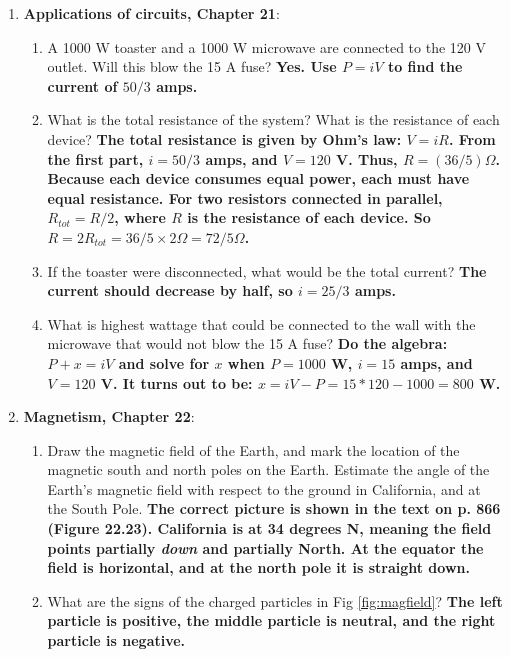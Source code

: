 \documentclass[10pt]{article}
\begin{document}
\maketitle

\begin{enumerate}
\item \textbf{Applications of circuits, Chapter 21}:
\begin{enumerate}
\item A 1000 W toaster and a 1000 W microwave are connected to the 120 V outlet.  Will this blow the 15 A fuse? \textbf{Yes.  Use $P = iV$ to find the current of $50/3$ amps.}
\item What is the total resistance of the system?  What is the resistance of each device? \textbf{The total resistance is given by Ohm's law: $V = i R$.  From the first part, $i = 50/3$ amps, and $V = 120$ V.  Thus, $R = (36/5) \Omega$.  Because each device consumes equal power, each must have equal resistance.  For two resistors connected in parallel, $R_{tot} = R/2$, where $R$ is the resistance of each device.  So $R = 2 R_{tot} = 36/5 \times 2 \Omega = 72/5 \Omega $.}
\item If the toaster were disconnected, what would be the total current? \textbf{The current should decrease by half, so $i = 25/3$ amps.}
\item What is highest wattage that could be connected to the wall with the microwave that would not blow the 15 A fuse? \textbf{Do the algebra: $P + x = iV$ and solve for $x$ when $P = 1000$ W, $i = 15$ amps, and $V = 120$ V.  It turns out to be: $x = iV - P = 15*120 - 1000 = 800$ W.}
\end{enumerate}
\item \textbf{Magnetism, Chapter 22}:
\begin{enumerate}
\item Draw the magnetic field of the Earth, and mark the location of the magnetic south and north poles on the Earth.  Estimate the angle of the Earth's magnetic field with respect to the ground in California, and at the South Pole. \textbf{The correct picture is shown in the text on p. 866 (Figure 22.23).  California is at 34 degrees N, meaning the field points partially \textit{down} and partially \textbf{North}.  At the equator the field is horizontal, and at the north pole it is straight down.}
\item What are the signs of the charged particles in Fig \ref{fig:magfield}? \textbf{The left particle is positive, the middle particle is neutral, and the right particle is negative.}

\end{enumerate}
\end{enumerate}
\end{document}
